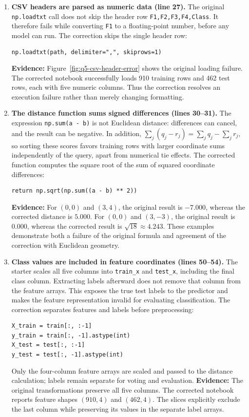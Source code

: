 \documentclass[12pt]{article}
\begin{document}
\begin{enumerate}
\begin{enumerate}[label=\alph*.]
    \item \textbf{CSV headers are parsed as numeric data (line 27).}
    The original \texttt{np.loadtxt} call does not skip the header row
    \texttt{F1,F2,F3,F4,Class}. It therefore fails while converting
    \texttt{F1} to a floating-point number, before any model can run.
    The correction skips the single header row:
\begin{lstlisting}
np.loadtxt(path, delimiter=",", skiprows=1)
\end{lstlisting}
    \textbf{Evidence:} Figure~\ref{fig:q5-csv-header-error} shows the original
    loading failure. The corrected notebook successfully loads 910 training
    rows and 462 test rows, each with five numeric columns. Thus the correction
    resolves an execution failure rather than merely changing formatting.

    \item \textbf{The distance function sums signed differences (lines 30--31).}
    The expression \texttt{np.sum(a - b)} is not Euclidean distance:
    differences can cancel, and the result can be negative.
    In addition, $\sum_j(q_j-r_j)=\sum_j q_j-\sum_j r_j$, so sorting these
    scores favors training rows with larger coordinate sums independently
    of the query, apart from numerical tie effects.
    The corrected function computes the square root of the sum of squared
    coordinate differences:
\begin{lstlisting}
return np.sqrt(np.sum((a - b) ** 2))
\end{lstlisting}
    \textbf{Evidence:} For $(0,0)$ and $(3,4)$, the original result is
    $-7.000$, whereas the corrected distance is $5.000$. For $(0,0)$ and
    $(3,-3)$, the original result is $0.000$, whereas the corrected result is
    $\sqrt{18}\approx4.243$. These examples demonstrate both a failure of
    the original formula and agreement of the correction with Euclidean geometry.

    \item \textbf{Class values are included in feature coordinates (lines 50--54).}
    The starter scales all five columns into \texttt{train\_x} and
    \texttt{test\_x}, including the final class column. Extracting labels
    afterward does not remove that column from the feature arrays. This exposes
    the true test labels to the predictor and makes the feature representation
    invalid for evaluating classification.
    The correction separates features and labels before preprocessing:
\begin{lstlisting}
X_train = train[:, :-1]
y_train = train[:, -1].astype(int)
X_test = test[:, :-1]
y_test = test[:, -1].astype(int)
\end{lstlisting}
    Only the four-column feature arrays are scaled and passed to the distance
    calculation; labels remain separate for voting and evaluation.
    \textbf{Evidence:} The original transformations preserve all five columns.
    The corrected notebook reports feature shapes $(910,4)$ and $(462,4)$.
    The slices explicitly exclude the last column while preserving its values
    in the separate label arrays.


\end{enumerate}
\end{enumerate}
\end{document}

